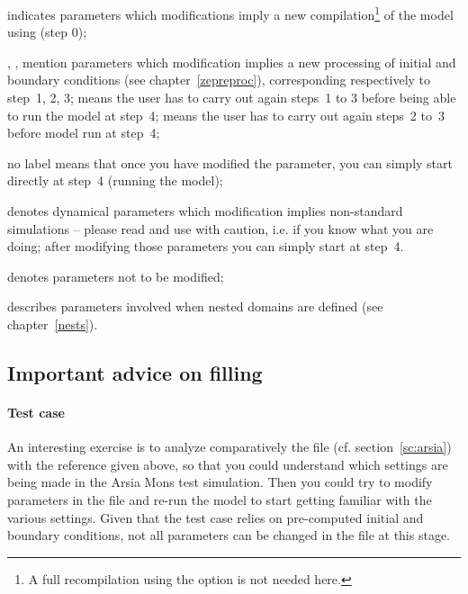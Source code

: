 \sk
\begin{citemize}
\item {} indicates parameters which modifications imply a new compilation\footnote{A full recompilation using the option  is not needed here.} of the model using  (step 0);
\item {}, ,  mention parameters which modification implies a new processing of initial and boundary conditions (see chapter~\ref{zepreproc}), corresponding respectively to step~1, 2, 3;  means the user has to carry out again steps~1 to 3 before being able to run the model at step~4;  means the user has to carry out again steps~2 to~3 before model run at step~4; 
\item no label means that once you have modified the parameter, you can simply start directly at step~4 (running the model);
\item {} denotes dynamical parameters which modification implies non-standard simulations -- please read  and use with caution, i.e. if you know what you are doing; after modifying those parameters you can simply start at step~4.
\item \ttt{(*)} denotes parameters not to be modified;
\item {} describes parameters involved when nested domains are defined (see chapter~\ref{nests}).
\end{citemize}

\sk
\small
{}
\normalsize

\sk
\subsection{Important advice on filling }\label{namelist}

\paragraph{Test case} An interesting exercise is to analyze comparatively the  file (cf. section~\ref{sc:arsia}) with the reference  given above, so that you could understand which settings are being made in the Arsia Mons test simulation. Then you could try to modify parameters in the  file and re-run the model to start getting familiar with the various settings. Given that the test case relies on pre-computed initial and boundary conditions, not all parameters can be changed in the  file at this stage.

